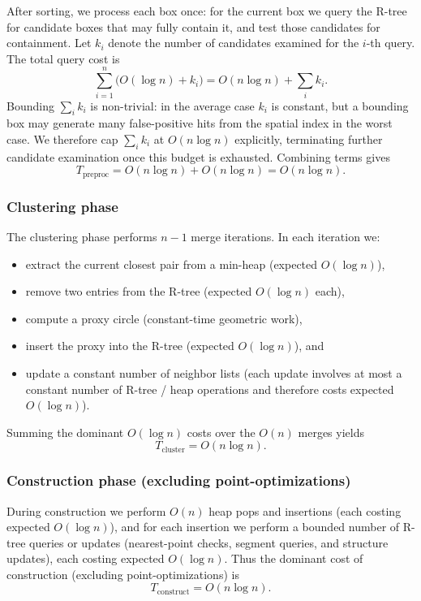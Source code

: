 \documentclass[11pt]{article}
\begin{document}
After sorting, we process each box once: for the current box we query the R\*-tree for candidate boxes that may fully contain it, and test those candidates for containment. Let $k_i$ denote the number of candidates examined for the $i$-th query. The total query cost is
$$\sum_{i=1}^n \bigl(O(\log n) + k_i\bigr) = O(n\log n) + \sum_i k_i.$$
Bounding $\sum_i k_i$ is non-trivial: in the average case $k_i$ is constant, but a bounding box may generate many false-positive hits from the spatial index in the worst case. We therefore cap $\sum_i k_i$ at $O(n \log n)$ explicitly, terminating further candidate examination once this budget is exhausted. Combining terms gives
$$T_{\text{preproc}} = O(n\log n) + O(n\log n) = O(n\log n).$$

\subsubsection{Clustering phase}
The clustering phase performs $n-1$ merge iterations.  In each iteration we:
\begin{itemize}
  \item extract the current closest pair from a min-heap (expected $O(\log n)$),
  \item remove two entries from the R\*-tree (expected $O(\log n)$ each),
  \item compute a proxy circle (constant-time geometric work),
  \item insert the proxy into the R\*-tree (expected $O(\log n)$), and
  \item update a constant number of neighbor lists (each update involves at most a constant number of R\*-tree / heap operations and therefore costs expected $O(\log n)$).
\end{itemize}
Summing the dominant $O(\log n)$ costs over the $O(n)$ merges yields
\[
T_{\text{cluster}} = O(n \log n).
\]

\subsubsection{Construction phase (excluding point-optimizations)}
During construction we perform $O(n)$ heap pops and insertions (each costing expected $O(\log n)$), and for each insertion we perform a bounded number of R\*-tree queries or updates (nearest-point checks, segment queries, and structure updates), each costing expected $O(\log n)$.  Thus the dominant cost of construction (excluding point-optimizations) is
\[
T_{\text{construct}} = O(n \log n).
\]
\end{document}
